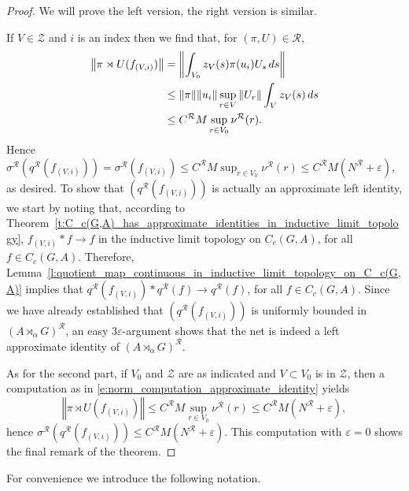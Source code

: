\documentclass{amsart}
\theoremstyle{plain}
\theoremstyle{definition}
\numberwithin{equation}{section}
\begin{document}
\begin{proof}
We will prove the left version, the right version is similar.

If $V \in \mathcal Z$ and $i$ is an index then we find that, for ${(\pi,U)} \in {\mathcal R}$,
\begin{align}\label{e:norm_computation_approximate_identity}
{\left\Vert {{\pi \rtimes U}(f_{(V,i)})} \right\Vert} &= {\left\Vert {\int_{V_0} z_V(s) \pi(u_i) U_s \,ds} \right\Vert} \\
&\leq {\left\Vert {\pi} \right\Vert} {\left\Vert {u_i} \right\Vert} \sup_{r \in V} {\left\Vert {U_r} \right\Vert} \int_{V} z_V(s)\,ds \notag\\
&\leq {{C^{\mathcal R}}}  M \sup_{r\in V_0}{\nu^{\mathcal R}}(r).\notag
\end{align}
Hence ${\sigma^{\mathcal R}}({q^{\mathcal R}}(f_{(V,i)}))={\sigma^{\mathcal R}}(f_{(V,i)}) \leq {{C^{\mathcal R}}}  M \sup_{r\in V_0}{\nu^{\mathcal R}}(r)\leq {{C^{\mathcal R}}} M({N^{\mathcal R}}+{\varepsilon})$, as desired. To show that $\left({q^{\mathcal R}}(f_{(V,i)})\right)$ is actually an approximate left identity, we start by noting that, according to Theorem~\ref{t:C_c(G,A)_has_approximate_identities_in_inductive_limit_topology}, $f_{(V,i)} * f \to f$ in the inductive limit topology on $C_c(G,A)$, for all $f \in C_c(G,A)$. Therefore, Lemma~\ref{l:quotient_map_continuous_in_inductive_limit_topology_on_C_c(G,A)} implies that ${q^{\mathcal R}}(f_{(V,i)}) * {q^{\mathcal R}}(f) \to {q^{\mathcal R}}(f)$, for all $f\in C_c(G,A)$. Since we have already established that $\left({q^{\mathcal R}}(f_{(V,i)})\right)$ is uniformly bounded in ${(A {\rtimes}_\alpha G)^\mathcal{R}}$, an easy $3{\varepsilon}$-argument shows that the net is indeed a left approximate identity of ${(A {\rtimes}_\alpha G)^\mathcal{R}}$.

As for the second part, if $V_0$ and $\mathcal Z$ are as indicated and $V\subset V_0$ is in $\mathcal Z$, then a computation as in \eqref{e:norm_computation_approximate_identity} yields
\[ {\left\Vert {{\pi \rtimes U}(f_{(V,i)})} \right\Vert} \leq {{C^{\mathcal R}}}  M \sup_{r\in V_0}{\nu^{\mathcal R}}(r)\leq {{C^{\mathcal R}}} M({N^{\mathcal R}}+{\varepsilon}), \]
hence ${\sigma^{\mathcal R}}({q^{\mathcal R}}(f_{(V,i)}))\leq  {{C^{\mathcal R}}}  M ({N^{\mathcal R}}+{\varepsilon})$. This computation with ${\varepsilon} = 0$ shows the final remark of the theorem.
\end{proof}

For convenience we introduce the following notation.
\end{document}
